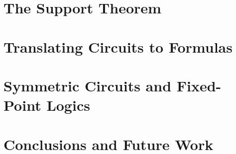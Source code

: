 \documentclass[a4paper,10pt,numbered,print,index]{../classes/PhDThesisPSnPDF}
\begin{document}
\chapter{The Support Theorem} %
\label{chpt:support}


\chapter{Translating Circuits to Formulas} %


\chapter{Symmetric Circuits and Fixed-Point Logics} %


\chapter{Conclusions and Future Work} %



\begin{spacing}{0.9}



\cleardoublepage





\end{spacing}



% 
% 


\printthesisindex %
\end{document}
